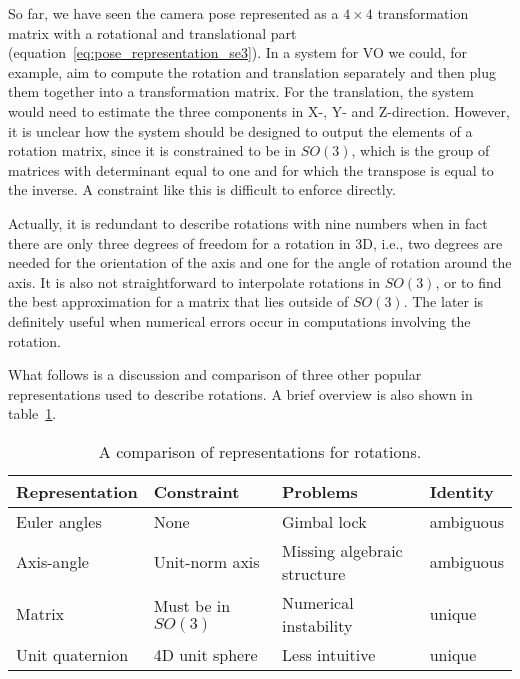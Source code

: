 		So far, we have seen the camera pose represented as a $4 \times 4$ transformation matrix with a rotational and translational part (equation~\ref{eq:pose_representation_se3}).
		In a system for VO we could, for example, aim to compute the rotation and translation separately and then plug them together into a transformation matrix.
		For the translation, the system would need to estimate the three components in X-, Y- and Z-direction.
		However, it is unclear how the system should be designed to output the elements of a rotation matrix, since it is constrained to be in 
		$SO(3)$, which is the group of matrices with determinant equal to one and for which the transpose is equal to the inverse.
		A constraint like this is difficult to enforce directly.
		
		Actually, it is redundant to describe rotations with nine numbers when in fact there are only three degrees of freedom for a rotation in 3D, i.e., two degrees are needed for the orientation of the axis and one for the angle of rotation around the axis.
		It is also not straightforward to interpolate rotations in $SO(3)$, or to find the best approximation for a matrix that lies outside of $SO(3)$.
		The later is definitely useful when numerical errors occur in computations involving the rotation.
		
		What follows is a discussion and comparison of three other popular representations used to describe rotations.
		A brief overview is also shown in table~\ref{tbl:comparison_representations_of_rotations}.
		\begin{table}
			\small
			\begin{center}
				\begin{tabular}{llll}
					\toprule
					Representation	& Constraint 			& Problems 				& Identity			\\
					\midrule
					Euler angles 	& None 					& Gimbal lock 			& ambiguous 		\\
					Axis-angle 		& Unit-norm axis 		& Missing algebraic structure						& ambiguous 		\\
					Matrix 			& Must be in $SO(3)$ 	& Numerical instability	& unique 			\\
					Unit quaternion & 4D unit sphere 		& Less intuitive 		& unique			\\
					\bottomrule
				\end{tabular}
			\end{center}
			\caption[A comparison of representations for rotations]
					{A comparison of representations for rotations.
					 \label{tbl:comparison_representations_of_rotations}}
		\end{table}
	
